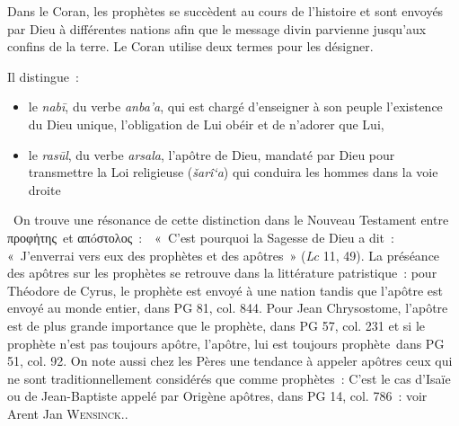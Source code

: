 
Dans le Coran, les prophètes se succèdent au cours de l'histoire et sont
envoyés par Dieu à différentes nations afin que le message divin
parvienne jusqu'aux confins de la terre. Le Coran utilise deux termes
pour les désigner.

\begin{Def}
 Il distingue~:

\begin{itemize}
\item
  le \emph{nabī}, du verbe \emph{anba'a}, qui est chargé d'enseigner à
  son peuple l'existence du Dieu unique, l'obligation de Lui obéir et de
  n'adorer que Lui,
\item
  le \emph{rasūl}, du verbe \emph{arsala}, l'apôtre de Dieu, mandaté par
  Dieu pour transmettre la Loi religieuse (\emph{šarî`a}) qui conduira
  les hommes dans la voie droite
\end{itemize}
\end{Def}
{~On trouve une résonance de
    cette distinction dans le Nouveau Testament entre \foreignlanguage{greek}{προφἠτης}~et \foreignlanguage{greek}{
    απóστολος}~:~~«~C'est pourquoi la Sagesse de Dieu a dit~:
    «~J'enverrai vers eux des prophètes et des apôtres~» (\emph{Lc} 11,
    49). La préséance des apôtres sur les prophètes se retrouve dans la
    littérature patristique~: pour Théodore de Cyrus, le prophète est
    envoyé à une nation tandis que l'apôtre est envoyé au monde entier,
    dans PG 81, col. 844. Pour Jean Chrysostome, l'apôtre est de plus
    grande importance que le prophète, dans PG 57, col. 231 et si le
    prophète n'est pas toujours apôtre, l'apôtre, lui est toujours
    prophète~dans PG 51, col. 92. On note aussi chez les Pères une
    tendance à appeler apôtres ceux qui ne sont traditionnellement
    considérés que comme prophètes~: C'est le cas d'Isaïe ou de
    Jean-Baptiste appelé par Origène apôtres, dans PG 14, col. 786~:
    voir Arent Jan \textsc{Wensinck}.}.

